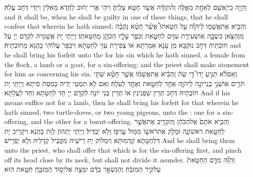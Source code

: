 {וְהָיָ֥ה כִֽי\maqqaf יֶאְשַׁ֖ם לְאַחַ֣ת מֵאֵ֑לֶּה וְהִ֨תְוַדָּ֔ה אֲשֶׁ֥ר חָטָ֖א עָלֶֽיהָ׃}
{וִיהֵי אֲרֵי יְחוּב לַחֲדָא מֵאִלֵּין וִיוַדֵּי דְּחָב עֲלַהּ׃}
{and it shall be, when he shall be guilty in one of these things, that he shall confess that wherein he hath sinned;}{}
{וְהֵבִ֣יא אֶת\maqqaf אֲשָׁמ֣וֹ לַיהֹוָ֡ה עַ֣ל חַטָּאתוֹ֩ אֲשֶׁ֨ר חָטָ֜א נְקֵבָ֨ה מִן\maqqaf הַצֹּ֥אן כִּשְׂבָּ֛ה אֽוֹ\maqqaf שְׂעִירַ֥ת עִזִּ֖ים לְחַטָּ֑את וְכִפֶּ֥ר עָלָ֛יו הַכֹּהֵ֖ן מֵחַטָּאתֽוֹ׃}
{וְיַיְתֵי יָת אֲשָׁמֵיהּ לִקְדָם יְיָ עַל חוֹבְתֵיהּ דְּחָב נוּקְבָּא מִן עָנָא אִמַּרְתָּא אוֹ צְפִירַת עִזֵּי לְחַטָּתָא וִיכַפַּר עֲלוֹהִי כָּהֲנָא מֵחוֹבְתֵיהּ׃}
{and he shall bring his forfeit unto the \lord\space for his sin which he hath sinned, a female from the flock, a lamb or a goat, for a sin-offering; and the priest shall make atonement for him as concerning his sin.}{}
{וְאִם\maqqaf לֹ֨א תַגִּ֣יעַ יָדוֹ֮ דֵּ֣י שֶׂה֒ וְהֵבִ֨יא אֶת\maqqaf אֲשָׁמ֜וֹ אֲשֶׁ֣ר חָטָ֗א שְׁתֵּ֥י תֹרִ֛ים אֽוֹ\maqqaf שְׁנֵ֥י בְנֵֽי\maqqaf יוֹנָ֖ה לַֽיהֹוָ֑ה אֶחָ֥ד לְחַטָּ֖את וְאֶחָ֥ד לְעֹלָֽה׃}
{וְאִם לָא תִמְטֵי יְדֵיהּ כְּמִסַּת סִיתָא וְיַיְתֵי יָת חוֹבְתֵיהּ דְּחָב תְּרֵין שַׁפְנִינִין אוֹ תְּרֵין בְּנֵי יוֹנָה לִקְדָם יְיָ חַד לְחַטָּתָא וְחַד לַעֲלָתָא׃}
{And if his means suffice not for a lamb, then he shall bring his forfeit for that wherein he hath sinned, two turtle-doves, or two young pigeons, unto the \lord: one for a sin-offering, and the other for a burnt-offering.}{}
{וְהֵבִ֤יא אֹתָם֙ אֶל\maqqaf הַכֹּהֵ֔ן וְהִקְרִ֛יב אֶת\maqqaf אֲשֶׁ֥ר לַחַטָּ֖את רִאשׁוֹנָ֑ה וּמָלַ֧ק אֶת\maqqaf רֹאשׁ֛וֹ מִמּ֥וּל עׇרְפּ֖וֹ וְלֹ֥א יַבְדִּֽיל׃}
{וְיַיְתֵי יָתְהוֹן לְוָת כָּהֲנָא וִיקָרֵיב יָת דִּלְחַטָּתָא קַדְמוּתָא וְיִמְלוֹק יָת רֵישֵׁיהּ מִקֳּבֵיל קְדָלֵיהּ וְלָא יַפְרֵישׁ׃}
{And he shall bring them unto the priest, who shall offer that which is for the sin-offering first, and pinch off its head close by its neck, but shall not divide it asunder.}{}
{וְהִזָּ֞ה מִדַּ֤ם הַחַטָּאת֙ עַל\maqqaf קִ֣יר הַמִּזְבֵּ֔חַ וְהַנִּשְׁאָ֣ר בַּדָּ֔ם יִמָּצֵ֖ה אֶל\maqqaf יְס֣וֹד הַמִּזְבֵּ֑חַ חַטָּ֖את הֽוּא׃}

